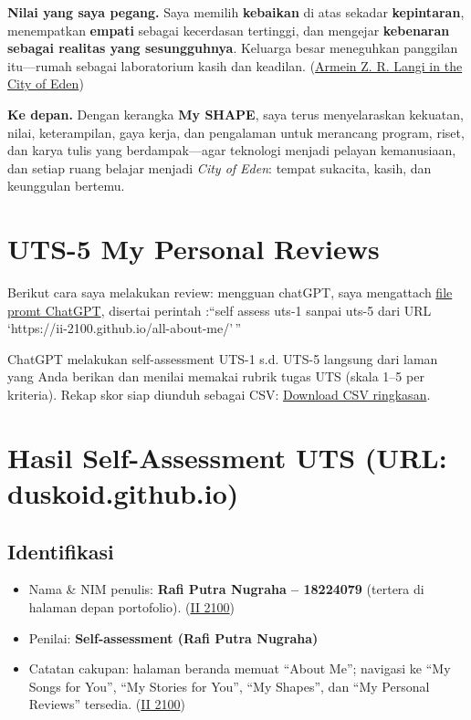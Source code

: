 \documentclass[
  letterpaper,
  DIV=11,
  numbers=noendperiod]{scrreprt}
\providecommand{\tightlist}{%
  \setlength{\itemsep}{0pt}\setlength{\parskip}{0pt}}\usepackage{longtable,booktabs,array}
\begin{document}
\textbf{Nilai yang saya pegang.} Saya memilih \textbf{kebaikan} di atas
sekadar \textbf{kepintaran}, menempatkan \textbf{empati} sebagai
kecerdasan tertinggi, dan mengejar \textbf{kebenaran sebagai realitas
yang sesungguhnya}. Keluarga besar meneguhkan panggilan itu---rumah
sebagai laboratorium kasih dan keadilan.
(\href{https://azrl.wordpress.com/2010/01/09/on-being-nice/?utm_source=chatgpt.com}{Armein
Z. R. Langi in the City of Eden})

\textbf{Ke depan.} Dengan kerangka \textbf{My SHAPE}, saya terus
menyelaraskan kekuatan, nilai, keterampilan, gaya kerja, dan pengalaman
untuk merancang program, riset, dan karya tulis yang berdampak---agar
teknologi menjadi pelayan kemanusiaan, dan setiap ruang belajar menjadi
\emph{City of Eden}: tempat sukacita, kasih, dan keunggulan bertemu.


\chapter{UTS-5 My Personal Reviews}\label{uts-5-my-personal-reviews}

Berikut cara saya melakukan review: mengguan chatGPT, saya mengattach
\href{skor_uts.pdf}{file promt ChatGPT}, disertai perintah :``self
assess uts-1 sanpai uts-5 dari URL
`https://ii-2100.github.io/all-about-me/'\,''

ChatGPT melakukan self-assessment UTS-1 s.d. UTS-5 langsung dari laman
yang Anda berikan dan menilai memakai rubrik tugas UTS (skala 1--5 per
kriteria). Rekap skor siap diunduh sebagai CSV:
\href{sandbox:/mnt/data/UTS_self_assessment.csv}{Download CSV
ringkasan}.


\chapter{Hasil Self-Assessment UTS (URL:
duskoid.github.io)}\label{hasil-self-assessment-uts-url-duskoid.github.io}

\section{Identifikasi}\label{identifikasi}

\begin{itemize}
\tightlist
\item
  Nama \& NIM penulis: \textbf{Rafi Putra Nugraha -- 18224079} (tertera
  di halaman depan portofolio).
  (\href{https://azrl.wordpress.com/2010/04/06/empati-kecerdasan-tertinggi/?utm_source=chatgpt.com}{II
  2100})
\item
  Penilai: \textbf{Self-assessment (Rafi Putra Nugraha)}
\item
  Catatan cakupan: halaman beranda memuat ``About Me''; navigasi ke ``My
  Songs for You'', ``My Stories for You'', ``My Shapes'', dan ``My
  Personal Reviews'' tersedia.
  (\href{https://azrl.wordpress.com/2010/04/06/empati-kecerdasan-tertinggi/?utm_source=chatgpt.com}{II
  2100})
\end{itemize}
\end{document}
